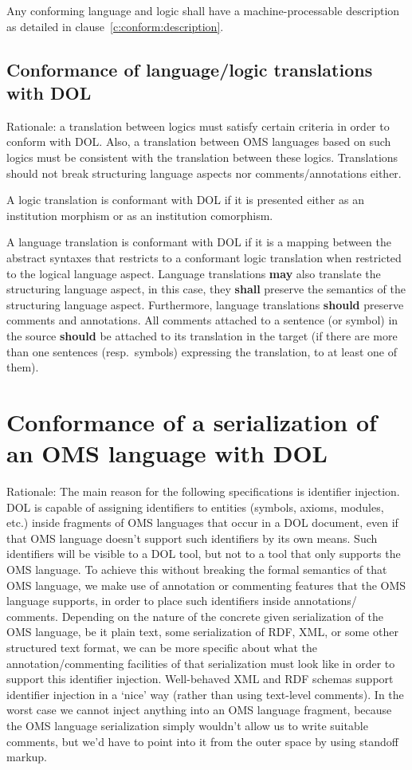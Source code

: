 \documentclass[10pt,%
\ifpretendfinal
final%
\else
draft%
\fi,
]{scrreprt}
\newcommand*{\shall}{\textbf{shall}\xspace}
\newcommand*{\should}{\textbf{should}\xspace}
\newcommand*{\may}{\textbf{may}\xspace}
\newcommand{\clauserefname}{clause}
\newcommand{\cref}[1]{\clauserefname~\ref{#1}}
\newcommand{\sclause}[1]{\section{#1}}
\newcommand{\ssclause}[1]{\subsection{#1}}
\begin{document}
Any conforming language and logic shall have a machine-processable description
 as detailed in \cref{c:conform:description}.

\ssclause{Conformance of language/logic translations with DOL}

Rationale: a translation between logics must satisfy certain criteria in order to conform with DOL.
Also, a translation between OMS languages based on such logics must be consistent with the
translation between these logics.  Translations should not break structuring language aspects nor
comments/annotations either.

A logic translation is conformant with DOL if it is presented either as an institution morphism or
as an institution comorphism.  

A language translation is conformant with DOL if it is a mapping
between the abstract syntaxes that restricts to a conformant logic
translation when restricted to the logical language aspect. Language
translations \may also translate the structuring language aspect, in
this case, they \shall preserve the semantics of the structuring
language aspect.  Furthermore, language translations \should preserve
comments and annotations.  All comments attached to a sentence (or
symbol) in the source \should be attached to its translation in the
target (if there are more than one sentences (resp.\ symbols)
expressing the translation, to at least one of them).


\sclause{Conformance of a serialization of an OMS language with DOL}\label{c:conform:serialization}

Rationale: The main reason for the following specifications is identifier injection. DOL is capable
of assigning identifiers to entities (symbols, axioms, modules, etc.) inside fragments of OMS
languages that occur in a DOL document, even if that OMS language doesn't support such identifiers
by its own means. 
Such identifiers will be visible to a DOL tool, but not to a tool that only supports the OMS
language.  To achieve this without breaking the formal semantics of that OMS language, we make use
of annotation or commenting features that the OMS language supports, in order to place such
identifiers inside annotations/ comments.  Depending on the nature of the concrete given
serialization of the OMS language, be it plain text, some serialization of RDF, XML, or some other 
structured text format, we can be more specific about what the annotation/commenting facilities of
that serialization must look like in order to support this identifier injection.  
Well-behaved XML and RDF schemas support identifier injection in a `nice' way (rather than using
text-level comments).   In the worst case we cannot 
inject anything into an OMS language fragment, because the OMS language serialization simply
wouldn't allow us to write suitable comments, but we'd have to point into it from the outer space
by using standoff markup.
\end{document}
